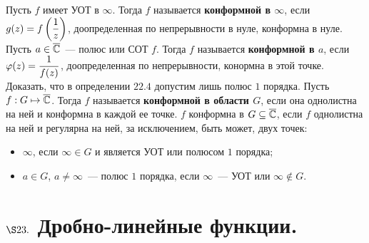 \Def
Пусть $f$ имеет УОТ в $\infty$. Тогда $f$ называется \textbf{конформной в
  $\infty$}, если $g(z) = f\left( \displaystyle \frac{1}{z} \right)$, доопределенная по
непрерывности в нуле, конформна в нуле.
\Def
Пусть $a \in \overline{\mathbb{C}}$~--- полюс или СОТ $f$. Тогда $f$ называется
\textbf{конформной в $a$}, если $\varphi(z) = \displaystyle \frac{1}{f(z)}$,
доопределенная по непрерывности, конормна в этой точке.
\Exse
Доказать, что в определении $22.4$ допустим лишь полюс $1$ порядка.
\Def
Пусть $f: G \mapsto \overline{\mathbb{C}}$. Тогда $f$ называется \textbf{конформной в области
  $G$}, если она однолистна на ней и конформна в каждой ее точке.
\prop
$f$ конформна в $G \subseteq \overline{\mathbb{C}}$, если $f$ однолистна на ней и регулярна на
ней, за исключением, быть может, двух точек:
\begin{itemize}
    \item $\infty$, если $\infty \in G$ и является УОТ или полюсом $1$ порядка;
    \item $a \in G$, $a \neq \infty$~--- полюс $1$ порядка, если $\infty$~---
    УОТ или $\infty \not \in G$.
\end{itemize}
\section{$\S 23.$ Дробно-линейные функции.}
